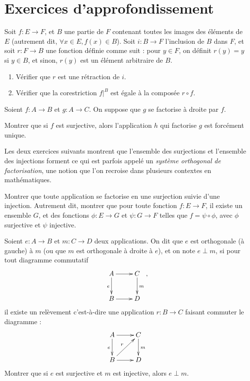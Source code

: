 \section{Exercices d'approfondissement}

\begin{exercice}
Soit $f : E\to F$, et $B$ une partie de $F$ contenant toutes les images des éléments de $E$ (autrement dit, $\forall x\in E, f(x)\in B$).
Soit $i : B\to F$ l'inclusion de $B$ dans $F$, et soit $r : F\to B$ une fonction définie comme suit : pour $y\in F$, on définit $r(y)=y$ si $y\in B$, et sinon, $r(y)$ est un élément arbitraire de $B$. 
\begin{enumerate}
\item Vérifier que $r$ est une rétraction de $i$.
\item Vérifier que la corestriction $f|^{B}$ est égale à la composée $r\circ f$.
\end{enumerate}
\end{exercice}

\begin{exercice}
Soient $f : A\to B$ et $g : A\to C$. On suppose que $g$ se factorise à droite par $f$.

Montrer que si $f$ est surjective, alors l'application $h$ qui factorise $g$ est forcément unique.
\end{exercice}


Les deux exercices suivants montrent que l'ensemble des surjections et l'ensemble des injections forment ce qui est parfois appelé un \emph{système orthogonal de factorisation}, une notion que l'on recroise dans plusieurs contextes en mathématiques.

\begin{exercice}
Montrer que toute application se factorise en une surjection suivie d'une injection. Autrement dit, montrer que pour toute fonction $f : E\to F$, il existe un ensemble $G$, et des fonctions $\phi : E\to G$ et $\psi : G\to F$ telles que $f = \psi\circ \phi$, avec $\phi$ surjective et $\psi$ injective.
\end{exercice}

\begin{exercice}
Soient $e : A\to B$ et $m : C\to D$ deux applications. On dit que $e$ est orthogonale (à gauche) à $m$ (ou que $m$ est orthogonale à droite à $e$), et on note $e\perp m$, si pour tout diagramme commutatif
\[
\xymatrix{
A \ar[r] \ar[d]_{e}& C\ar[d]^{m}\\
B \ar[r]& D 
},
\]
il existe un relèvement c'est-à-dire une application $r : B\to C$ faisant commuter le diagramme :
\[
\xymatrix{
A \ar[r] \ar[d]_{e}& C\ar[d]^{m}\\
B \ar[r]\ar[ur]^{r}& D 
}
\]
Montrer que si $e$ est surjective et $m$ est injective, alors $e\perp m$.
\end{exercice}

